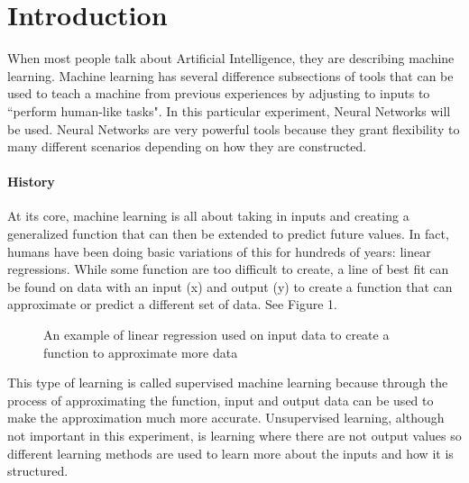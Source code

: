 \documentclass[12pt]{article}
\begin{document}
\maketitle

\section{Introduction}
\quad When most people talk about Artificial Intelligence, they are describing machine learning. Machine learning has several difference subsections of tools that can be used to teach a machine from previous experiences by adjusting to inputs to ``perform human-like tasks". In this particular experiment, Neural Networks will be used. Neural Networks are very powerful tools because they grant flexibility to many different scenarios depending on how they are constructed. 


\paragraph{History}
At its core, machine learning is all about taking in inputs and creating a generalized function that can then be extended to predict future values. In fact, humans have been doing basic variations of this for hundreds of years: linear regressions. While some function are too difficult to create, a line of best fit can be found on data with an input (x) and output (y) to create a function that can approximate or predict a different set of data. See Figure 1. \cite{kurenkov}

\begin{figure}[H]
    \centering
    \def\svgwidth{\columnwidth}
    
    \caption{An example of linear regression used on input data to create a function to approximate more data}
\end{figure}

This type of learning is called supervised machine learning because through the process of approximating the function, input and output data can be used to make the approximation much more accurate. Unsupervised learning, although not important in this experiment, is learning where there are not output values so different learning methods are used to learn more about the inputs and how it is structured. \cite{brownlee_2016}\\%
\end{document}
